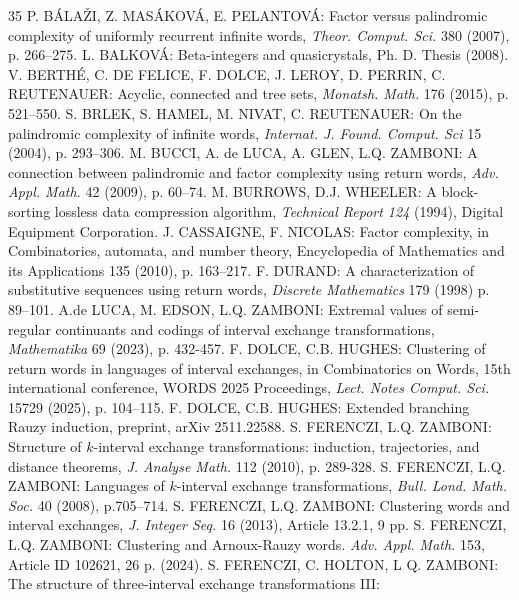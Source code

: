\documentclass[12pt,a4paper]{amsart}
\begin{document}
\begin{thebibliography}{35}
 P. B\'ALA\v{Z}I, Z. MAS\' AKOV\'A, E. PELANTOV\' A:
Factor versus palindromic complexity of uniformly recurrent infinite words,
{\it Theor. Comput. Sci.} 380 (2007), p. 266--275. 
 L. BALKOV\'A: Beta-integers and quasicrystals, Ph. D. Thesis (2008).
 V. BERTH\'E, C. DE FELICE, F. DOLCE, J. LEROY, D. PERRIN, C. REUTENAUER: Acyclic, connected and tree sets, 
{\it Monatsh. Math.} 176  (2015), p. 521--550. 
 S. BRLEK, S. HAMEL, M. NIVAT, C. REUTENAUER: On the palindromic complexity of infinite words, {\it Internat. J. Found. Comput. Sci} 15 (2004), p. 293--306.
 M. BUCCI, A. de LUCA, A. GLEN, L.Q. ZAMBONI: A connection between palindromic and factor complexity
using return words, {\it Adv. Appl. Math.} 42 (2009), p.  60--74.
 M. BURROWS, D.J. WHEELER: A block-sorting lossless data compression algorithm, {\it Technical Report 124} (1994), Digital Equipment Corporation.
 J. CASSAIGNE, F. NICOLAS: Factor complexity, in 
Combinatorics, automata, and number theory,  Encyclopedia of Mathematics and its Applications 135 (2010), p. 163--217. 
 F. DURAND: A characterization of substitutive sequences using return words,  {\it Discrete Mathematics} 179 (1998) p. 89--101.
 A.de LUCA, M. EDSON, L.Q. ZAMBONI: Extremal values of semi-regular continuants and codings of interval exchange transformations, {\it Mathematika} 69 (2023), p. 432-457.
  F. DOLCE, C.B. HUGHES: Clustering of return words in languages of interval exchanges, in Combinatorics on Words, 15th international conference, WORDS 2025 Proceedings, {\it Lect. Notes Comput. Sci.} 15729 (2025), p. 104--115.
  F. DOLCE, C.B. HUGHES: Extended branching Rauzy induction, preprint, arXiv 2511.22588.
 S. FERENCZI, L.Q. ZAMBONI:
Structure of $k$-interval exchange
transformations:  induction, trajectories, and distance theorems,  {\it J. Analyse Math.}  112 (2010), p. 289-328.
 S. FERENCZI, L.Q. ZAMBONI:
Languages of $k$-interval exchange transformations,
{\it Bull. Lond. Math. Soc.} 40 (2008), p.705--714.
 S. FERENCZI, L.Q. ZAMBONI: Clustering words and interval exchanges, {\it J. Integer Seq.} 16 (2013), Article 13.2.1, 9 pp.
 S. FERENCZI, L.Q. ZAMBONI:
Clustering and Arnoux-Rauzy words. 
{\it Adv. Appl. Math.} 153, Article ID 102621, 26 p. (2024). 
   S. FERENCZI, C. HOLTON, L Q. ZAMBONI: 
 The structure of three-interval exchange  transformations III: 

\end{thebibliography}
\end{document}
